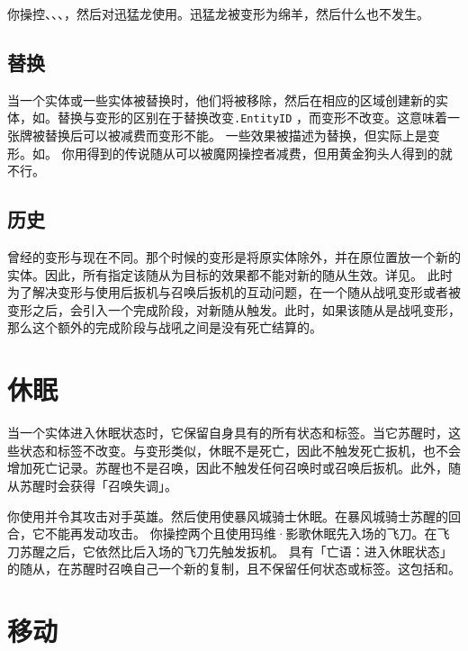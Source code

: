 \example 你操控、、、，然后对迅猛龙使用。迅猛龙被变形为绵羊，然后什么也不发生。

\subsection{替换}

当一个实体或一些实体被替换时，他们将被移除，然后在相应的区域创建新的实体，如。替换与变形的区别在于替换改变\texttt{.EntityID} ，而变形不改变。这意味着一张牌被替换后可以被减费而变形不能。
\notice 一些效果被描述为替换，但实际上是变形。如。
\example 你用得到的传说随从可以被魔网操控者减费，但用黄金狗头人得到的就不行。

\subsection{历史}

曾经的变形与现在不同。那个时候的变形是将原实体除外，并在原位置放一个新的实体。因此，所有指定该随从为目标的效果都不能对新的随从生效。详见。
\notice 此时为了解决变形与使用后扳机与召唤后扳机的互动问题，在一个随从战吼变形或者被变形之后，会引入一个完成阶段，对新随从触发。此时，如果该随从是战吼变形，那么这个额外的完成阶段与战吼之间是没有死亡结算的。

\section{休眠}
当一个实体进入休眠状态时，它保留自身具有的所有状态和标签。当它苏醒时，这些状态和标签不改变。与变形类似，休眠不是死亡，因此不触发死亡扳机，也不会增加死亡记录。苏醒也不是召唤，因此不触发任何召唤时或召唤后扳机。此外，随从苏醒时会获得「召唤失调」。

\example 你使用并令其攻击对手英雄。然后使用使暴风城骑士休眠。在暴风城骑士苏醒的回合，它不能再发动攻击。
\example 你操控两个且使用玛维·影歌休眠先入场的飞刀。在飞刀苏醒之后，它依然比后入场的飞刀先触发扳机。
\exception 具有「亡语：进入休眠状态」的随从，在苏醒时召唤自己一个新的复制，且不保留任何状态或标签。这包括和。

\section{移动}
\label{move}


